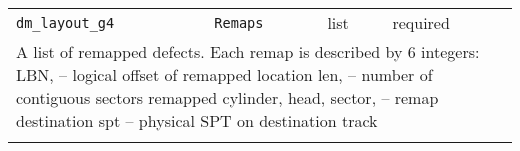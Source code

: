 \noindent 
\begin{tabular}{|p{\lpmodwidth}|p{\lpnamewidth}|p{0.5in}|p{0.5in}|}
\cline{1-4}
\texttt{dm\_layout\_g4} & \texttt{Remaps} & list & required \\ 
\cline{1-4}
\multicolumn{4}{|p{6in}|}{
A list of remapped defects. Each remap is described by 6 integers:
LBN, -- logical offset of remapped location
len, -- number of contiguous sectors remapped
cylinder, head, sector, -- remap destination
spt -- physical SPT on destination track
}\\ 
\cline{1-4}
\multicolumn{4}{p{5in}}{}\\
\end{tabular}\\ 
